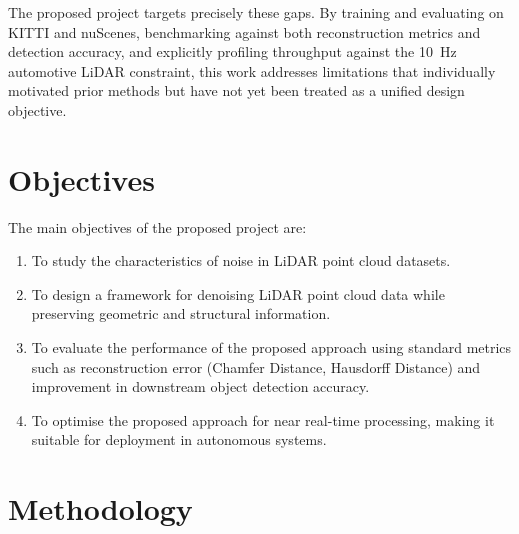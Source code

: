 \documentclass[12pt,a4paper]{article}
\begin{document}
The proposed project targets precisely these gaps. By training and evaluating
on KITTI and nuScenes, benchmarking against both reconstruction metrics and
detection accuracy, and explicitly profiling throughput against the 10~Hz
automotive LiDAR constraint, this work addresses limitations that
individually motivated prior methods but have not yet been treated as a
unified design objective.
\clearpage

\section{Objectives}

The main objectives of the proposed project are:

\begin{enumerate}
\item To study the characteristics of noise in LiDAR point cloud datasets.
\item To design a framework for denoising LiDAR point cloud data while
      preserving geometric and structural information.
\item To evaluate the performance of the proposed approach using standard
      metrics such as reconstruction error (Chamfer Distance, Hausdorff
      Distance) and improvement in downstream object detection accuracy.
\item To optimise the proposed approach for near real-time processing, making
      it suitable for deployment in autonomous systems.
\end{enumerate}
\clearpage

\section{Methodology}
\end{document}
